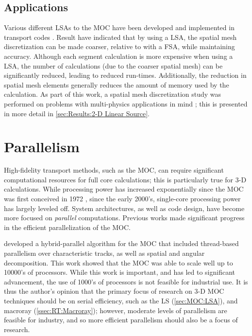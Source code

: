 {{        \subsection{Applications}{\label{ssec:MOC:LSA:Applications}
            Various different \acp{LSA} to the \ac{MOC} have been developed and implemented in transport codes \cite{Halsall1993,Petkov1999,Santandrea2002,Tang2009,Rabiti2009,Boyd2014,Ferrer2016,Fitzgerald2018}.
            Result have indicated that by using a \ac{LSA}, the spatial mesh discretization can be made coarser, relative to with a \ac{FSA}, while maintaining accuracy.
            Although each segment calculation is more expensive when using a \ac{LSA}, the number of calculations (due to the coarser spatial mesh) can be significantly reduced, leading to reduced run-times.
            Additionally, the reduction in spatial mesh elements generally reduces the amount of memory used by the calculation.
            As part of this work, a spatial mesh discretization study was performed on problems with multi-physics applications in mind \cite{Fitzgerald2019}; this is presented in more detail in \cref{sec:Results:2-D Linear Source}.
        }
    }
    \section{Parallelism}{\label{sec:MOC:Parallelism}
        High-fidelity transport methods, such as the \ac{MOC}, can require significant computational resources for full core calculations; this is particularly true for 3-D calculations.
        While processing power has increased exponentially since the \ac{MOC} was first conceived in 1972 \cite{Askew1972}, since the early 2000's, single-core processing power has largely leveled off.
        System architectures, as well as code design, have become more focused on \emph{parallel} computations.
        Previous works \cite{Kochunas2013} made significant progress in the efficient parallelization of the \ac{MOC}.

        \citet{Kochunas2013} developed a hybrid-parallel algorithm for the \ac{MOC} that included thread-based parallelism over characteristic tracks, as well as spatial and angular decomposition.
        This work showed that the \ac{MOC} was able to scale well up to 10000's of processors.
        While this work is important, and has led to significant advancement, the use of 1000's of processors is not feasible for industrial use.
        It is thus the author's opinion that the primary focus of research on 3-D \ac{MOC} techniques should be on serial efficiency, such as the \acf{LS} (\cref{sec:MOC:LSA}), and macroray (\cref{ssec:RT:Macroray});
        however, moderate levels of parallelism are feasible for industry, and so more efficient parallelism should also be a focus of research.

}}
